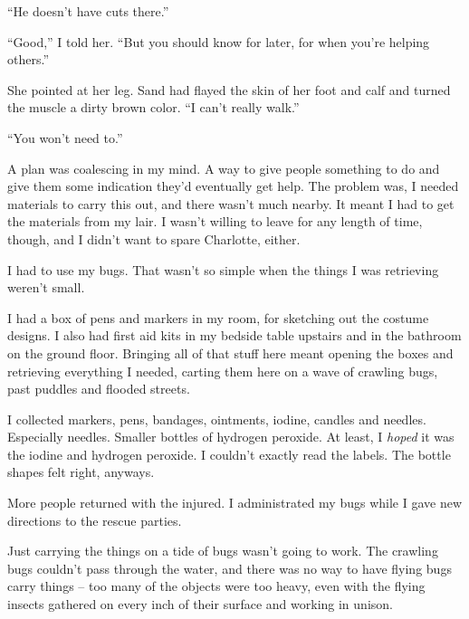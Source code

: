 ``He doesn't have cuts there.''



``Good,'' I told her.  ``But you should know for later, for when you're helping others.''



She pointed at her leg.  Sand had flayed the skin of her foot and calf and turned the muscle a dirty brown color.  ``I can't really walk.''



``You won't need to.''



A plan was coalescing in my mind.  A way to give people something to do and give them some indication they'd eventually get help.  The problem was, I needed materials to carry this out, and there wasn't much nearby.  It meant I had to get the materials from my lair.  I wasn't willing to leave for any length of time, though, and I didn't want to spare Charlotte, either.



I had to use my bugs.  That wasn't so simple when the things I was retrieving weren't small.



I had a box of pens and markers in my room, for sketching out the costume designs.  I also had first aid kits in my bedside table upstairs and in the bathroom on the ground floor.  Bringing all of that stuff here meant opening the boxes and retrieving everything I needed, carting them here on a wave of crawling bugs, past puddles and flooded streets.



I collected markers, pens, bandages, ointments, iodine, candles and needles.  Especially needles.  Smaller bottles of hydrogen peroxide.  At least, I \emph{hoped} it was the iodine and hydrogen peroxide.  I couldn't exactly read the labels.  The bottle shapes felt right, anyways.



More people returned with the injured.  I administrated my bugs while I gave new directions to the rescue parties.



Just carrying the things on a tide of bugs wasn't going to work.  The crawling bugs couldn't pass through the water, and there was no way to have flying bugs carry things – too many of the objects were too heavy, even with the flying insects gathered on every inch of their surface and working in unison.



